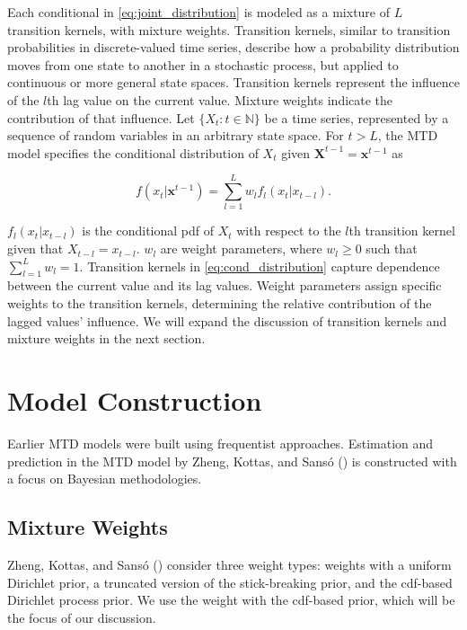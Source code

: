 \documentclass[
  letterpaper,
  double,
  12pt,
  1.0in]{beavtex}
\begin{document}
Each conditional in \eqref{eq:joint_distribution} is modeled as a
mixture of \(L\) transition kernels, with mixture weights. Transition
kernels, similar to transition probabilities in discrete-valued time
series, describe how a probability distribution moves from one state to
another in a stochastic process, but applied to continuous or more
general state spaces. Transition kernels represent the influence of the
\(l\)th lag value on the current value. Mixture weights indicate the
contribution of that influence. Let \(\{ X_t: t \in \mathbb{N} \}\) be a
time series, represented by a sequence of random variables in an
arbitrary state space. For \(t > L\), the MTD model specifies the
conditional distribution of \(X_t\) given
\(\textbf{X}^{t-1} = \textbf{x}^{t-1}\) as

\begin{equation}
f(x_t | \textbf{x}^{t-1}) = \sum_{l=1}^L w_l f_l (x_t | x_{t-l}).
\label{eq:cond_distribution}
\end{equation}

\(f_l (x_t | x_{t-l})\) is the conditional pdf of \(X_t\) with respect
to the \(l\)th transition kernel given that \({X}_{t-l} = {x}_{t-l}\).
\(w_l\) are weight parameters, where \(w_l \geq 0\) such that
\(\sum_{l=1}^L w_l = 1\). Transition kernels in
\eqref{eq:cond_distribution} capture dependence between the current
value and its lag values. Weight parameters assign specific weights to
the transition kernels, determining the relative contribution of the
lagged values' influence. We will expand the discussion of transition
kernels and mixture weights in the next section.

\section{Model Construction}\label{modelconstruction}

Earlier MTD models were built using frequentist approaches. Estimation
and prediction in the MTD model by Zheng, Kottas, and Sansó
() is constructed with a focus
on Bayesian methodologies.

\subsection{Mixture Weights}\label{mixtureweight}

Zheng, Kottas, and Sansó ()
consider three weight types: weights with a uniform Dirichlet prior, a
truncated version of the stick-breaking prior, and the cdf-based
Dirichlet process prior. We use the weight with the cdf-based prior,
which will be the focus of our discussion.
\end{document}
